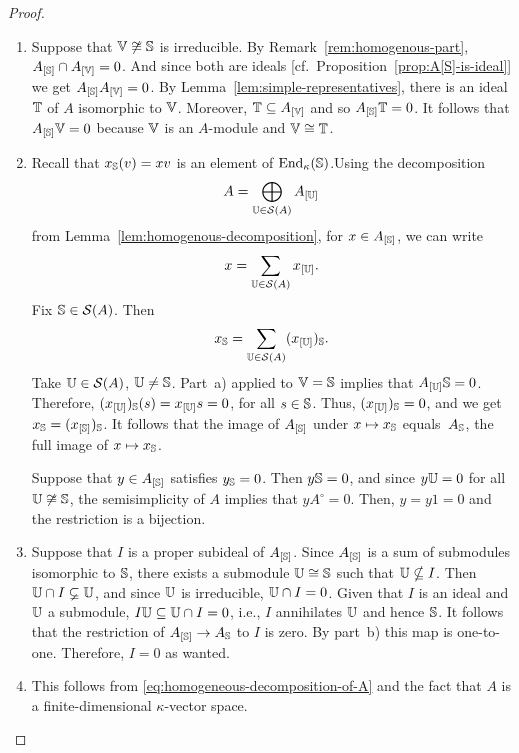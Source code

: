 \begin{proof}${}$
    \begin{enumerate}[\rm a)] 
        \item Suppose that $\mathbb V\not\cong\mathbb S$ is irreducible. By Remark~\ref{rem:homogenous-part}, $A_{[\mathbb S]}\cap A_{[\mathbb V]}=0$. And since both are ideals [cf.~Proposition~\ref{prop:A[S]-is-ideal}] we get $A_{[\mathbb S]}A_{[\mathbb V]}=0$. By Lemma~\ref{lem:simple-representatives}, there is an ideal $\mathbb T$ of $A$ isomorphic to $\mathbb V$. Moreover, $\mathbb T\subseteq A_{[\mathbb V]}$ and so $A_{[\mathbb S]}\mathbb T=0$. It follows that $A_{[\mathbb S]}\mathbb V=0$ because $\mathbb V$ is an $A$-module and $\mathbb V\cong\mathbb T$.

        \item Recall that $x_\mathbb S(v)=xv$ is an element of ${\operatorname{End}}_\kappa(\mathbb S)$.Using the decomposition
        \begin{equation}\label{eq:homogeneous-decomposition-of-A}
            A=\bigoplus_{\mathbb U\in\mathcal S(A)}A_{[\mathbb U]}
        \end{equation}
        from Lemma~\ref{lem:homogenous-decomposition}, for $x\in A_{[\mathbb S]}$, we can write
        $$
            x=\sum_{\mathbb U\in\mathcal S(A)}
                x_{[\mathbb U]}.
        $$
        Fix $\mathbb S\in\mathcal S(A)$. Then
        \begin{equation}\label{eq:homogeneous-decomposition-1}
            x_{\mathbb S} = \sum_{\mathbb U\in\mathcal S(A)}
                (x_{[\mathbb U]})_{\mathbb S}.
        \end{equation}
        Take $\mathbb U\in\mathcal S(A)$, $\mathbb U\ne\mathbb S$. Part~a) applied to $\mathbb V=\mathbb S$ implies that $A_{[\mathbb U]}\mathbb S=0$. Therefore, $(x_{[\mathbb U]})_{\mathbb S}(s)=x_{[\mathbb U]}s=0$, for all $s\in\mathbb S$. Thus, $(x_{[\mathbb U]})_{\mathbb S}=0$, and we get $x_{\mathbb S}=(x_{[\mathbb S]})_{\mathbb S}$. It follows that the image of $A_{[\mathbb S]}$ under $x\mapsto x_{\mathbb S}$ equals~$A_{\mathbb S}$, the full image of $x\mapsto x_{\mathbb S}$.
        
        Suppose that $y\in A_{[\mathbb S]}$ satisfies $y_\mathbb S=0$. Then $y\mathbb S=0$, and since $y\mathbb U=0$ for all $\mathbb U\not\cong\mathbb S$, the semisimplicity of $A$ implies that $yA^\circ=0$. Then, $y=y1=0$ and the restriction is a bijection.

        \item Suppose that $I$ is a proper subideal of $A_{[\mathbb S]}$. Since $A_{[\mathbb S]}$ is a sum of submodules isomorphic to $\mathbb S$, there exists a submodule $\mathbb U\cong\mathbb S$ such that $\mathbb U\nsubseteq I$. Then $\mathbb U\cap I\varsubsetneq\mathbb U$, and since $\mathbb U$ is irreducible, $\mathbb U\cap I=0$. Given that $I$ is an ideal and $\mathbb U$ a submodule, $I\mathbb U\subseteq\mathbb U\cap I=0$, i.e., $I$ annihilates $\mathbb U$ and hence $\mathbb S$. It follows that the restriction of $A_{[\mathbb S]}\to A_\mathbb S$ to $I$ is zero. By part~b) this map is one-to-one. Therefore, $I=0$ as wanted.

        \item This follows from \eqref{eq:homogeneous-decomposition-of-A} and the fact that $A$ is a finite-dimensional $\kappa$-vector space.
    \end{enumerate}
\end{proof}


